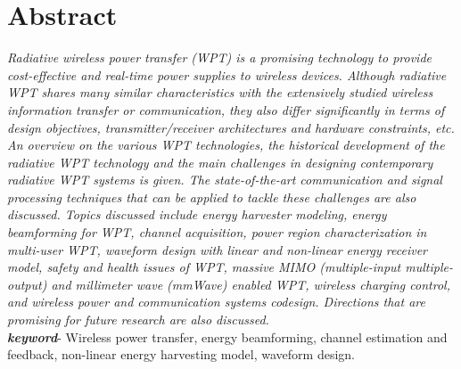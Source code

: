 \documentclass[hidelinks, 12pt]{report}
\begin{document}
\chapter*{Abstract}
\justify
\textit{
Radiative wireless power transfer (WPT) is a promising technology to provide cost-effective and real-time power supplies to wireless devices. Although radiative WPT shares many similar characteristics with the extensively studied wireless information transfer or communication, they also differ significantly in terms of design objectives, transmitter/receiver architectures and hardware constraints, etc. An overview on the various WPT technologies, the historical development of the radiative WPT technology and the main challenges in designing contemporary radiative WPT systems is given. The state-of-the-art communication and signal processing techniques that can be applied to tackle these challenges are also discussed. Topics discussed include energy harvester modeling, energy beamforming for WPT, channel acquisition, power region characterization in multi-user WPT, waveform design with linear and non-linear energy receiver model, safety and health issues of WPT, massive MIMO (multiple-input multiple-output) and millimeter wave (mmWave) enabled WPT, wireless charging control, and wireless power and communication systems codesign. Directions that are promising for future research are also discussed.}\\

\textit{\textbf{keyword}}- 
Wireless power transfer, energy beamforming, channel estimation and feedback, non-linear energy harvesting model, waveform design.

\pagebreak
\setcounter{page}{1}
\justify
\begin{spacing}{0.8}
\renewcommand{\contentsname}{Table of Contents}
\pdfbookmark{\contentsname}{Table of Contents}
\tableofcontents
\end{spacing}
\pagebreak
\listoffigures 
\pagebreak
\renewcommand{\nomname}{List of Abbreviations}
\printnomenclature
\pagebreak
\end{document}
